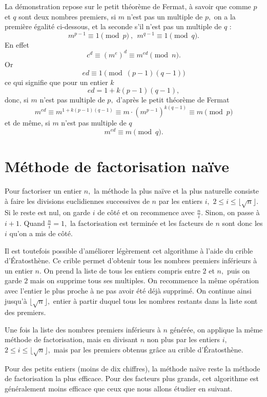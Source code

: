 \documentclass[french, 12pt, titlepage]{article}
\begin{document}
La démonstration repose sur le petit théorème de Fermat, à savoir que comme $p$ et $q$ sont deux nombres premiers, si $m$ n'est pas un multiple de $p,$ on a la première égalité ci-dessous, et la seconde s'il n'est pas un multiple de $q$ :
\[ m^{p-1} \equiv 1 \pmod p\ ,\ \ m^{q-1} \equiv 1 \pmod q.\]
En effet
\[ c^d \equiv (m^e)^d \equiv m^{ed} \pmod n.\]
Or
\[ed \equiv 1 \pmod{(p-1)(q-1)}\]
ce qui signifie que pour un entier $k$
\[ed = 1 + k(p-1)(q-1),\]
donc, si $m$ n'est pas multiple de $p,$ d'après le petit théorème de Fermat
\[m^{ed} \equiv m^{1+k(p-1)(q-1) }\equiv m\cdot \left(m^{p-1}\right)^{k(q-1)}\equiv m \pmod p\]
et de même, si $m$ n'est pas multiple de $q$
\[m^{ed}\equiv m \pmod q.\]

\section{Méthode de factorisation naïve}

Pour factoriser un entier $n,$ la méthode la plus naïve et la plus naturelle consiste à faire les divisions euclidiennes successives de $n$ par les entiers $i,$ $2 \leq i \leq \lfloor\sqrt{n}\rfloor.$ Si le reste est nul, on garde $i$ de côté et on recommence avec $\frac{n}{i}.$ Sinon, on passe à $i + 1.$ Quand $\frac{n}{i} = 1,$ la factorisation est terminée et les facteurs de $n$ sont donc les $i$ qu'on a mis de côté.

Il est toutefois possible d'améliorer légèrement cet algorithme à l'aide du crible d'{\'E}ratosthène. Ce crible permet d'obtenir tous les nombres premiers inférieurs à un entier $n.$
On prend la liste de tous les entiers compris entre $2$ et $n,$ puis on garde $2$ mais on supprime tous ses multiples. On recommence la même opération avec l'entier le plus proche à ne pas avoir été déjà supprimé.
On continue ainsi jusqu'à $\lfloor\sqrt{n}\rfloor,$ entier à partir duquel tous les nombres restants dans la liste sont des premiers.

Une fois la liste des nombres premiers inférieurs à $n$ générée, on applique la même méthode de factorisation, mais en divisant $n$ non plus par les entiers $i,$ $2 \leq i \leq \lfloor\sqrt{n}\rfloor,$
mais par les premiers obtenus grâce au crible d'{\'E}ratosthène.

Pour des petits entiers (moins de dix chiffres), la méthode naïve reste la méthode de factorisation la plus efficace. Pour des facteurs plus grands, cet algorithme est généralement moins efficace
que ceux que nous allons étudier en suivant.
\end{document}
